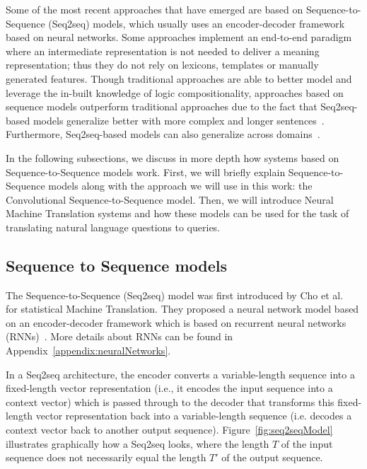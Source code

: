 Some of the most recent approaches that have emerged are based on Sequence-to-Sequence (Seq2seq) 
models, which usually uses an encoder-decoder framework based on neural networks. Some 
approaches implement an end-to-end paradigm where an intermediate representation is not 
needed to deliver a meaning representation; thus they do not rely on lexicons, templates or 
manually generated features. Though traditional approaches are able to better model and 
leverage the in-built knowledge of logic compositionality, approaches based on sequence 
models outperform traditional approaches due to the fact that Seq2seq-based models generalize 
better with more complex and longer sentences~\cite{semPar:JiaL16}. Furthermore, Seq2seq-based 
models can also generalize across domains~\cite{semPar:KamathD19}.

In the following subsections, we discuss in more depth how systems based on 
Sequence-to-Sequence models work. First, we will briefly explain Sequence-to-Sequence models 
along with the approach we will use in this work: the Convolutional Sequence-to-Sequence model. 
Then, we will introduce Neural Machine Translation systems and how these models can be used 
for the task of translating natural language questions to \SPARQL{} queries.

\subsection{Sequence to Sequence models}
\label{cap2:theoFrame/semPar/seq2seq}
The Sequence-to-Sequence (Seq2seq) model was first introduced by 
Cho et al.~\cite{seqlab:ChoMBB14} for statistical Machine Translation. 
They proposed a neural network model based on an encoder-decoder framework 
which is based on recurrent neural networks 
(RNNs)~\cite{semPar:werbos1990, semPar:rumelhart1986,seqlab:HochreiterS97}. More details 
about RNNs can be found in Appendix~\ref{appendix:neuralNetworks}.

In a Seq2seq architecture, the encoder converts a variable-length sequence into a fixed-length 
vector representation (i.e., it encodes the input sequence into a context vector) which is 
passed through to the decoder that transforms this fixed-length vector representation back 
into a variable-length sequence (i.e. decodes a context vector back to another output 
sequence). Figure~\ref{fig:seq2seqModel} illustrates graphically how a Seq2seq looks, where 
the length $T$ of the input sequence does not necessarily equal the length $T'$ of the output 
sequence.


